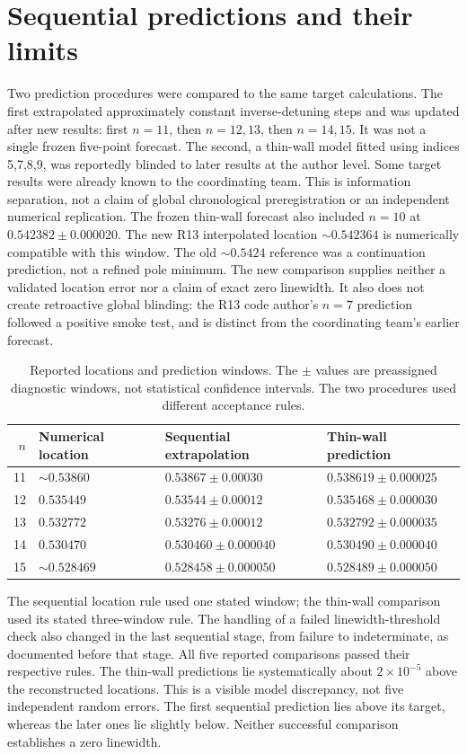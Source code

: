 \documentclass[a4paper,11pt]{article}
\begin{document}
\section{Sequential predictions and their limits}\label{sec:predictions}
Two prediction procedures were compared to the same target calculations.
The first extrapolated approximately constant inverse-detuning steps and
was updated after new results: first $n=11$, then $n=12,13$, then $n=14,15$.
It was not a single frozen five-point forecast. The second, a thin-wall
model fitted using indices 5,7,8,9, was reportedly blinded to later results
at the author level. Some target results were already known to the
coordinating team. This is information separation, not a claim of global
chronological preregistration or an independent numerical replication.
The frozen thin-wall forecast also included $n=10$ at
$0.542382\pm0.000020$. The new R13 interpolated location
$\sim0.542364$ is numerically compatible with this window. The old
$\sim0.5424$ reference was a continuation prediction, not a refined pole
minimum. The new comparison supplies neither a validated location error
nor a claim of exact zero linewidth. It also does not create retroactive
global blinding: the R13 code author's $n=7$ prediction followed a positive
smoke test, and is distinct from the coordinating team's earlier forecast.

\begin{table}[htbp]\centering\small
\caption{Reported locations and prediction windows. The $\pm$ values are
preassigned diagnostic windows, not statistical confidence intervals.
The two procedures used different acceptance rules.}\label{tab:forecast}
\begin{tabular}{rlll}\toprule
$n$&Numerical location&Sequential extrapolation&Thin-wall prediction\\\midrule
11&$\sim0.53860$&$0.53867\pm0.00030$&$0.538619\pm0.000025$\\
12&$0.535449$&$0.53544\pm0.00012$&$0.535468\pm0.000030$\\
13&$0.532772$&$0.53276\pm0.00012$&$0.532792\pm0.000035$\\
14&$0.530470$&$0.530460\pm0.000040$&$0.530490\pm0.000040$\\
15&$\sim0.528469$&$0.528458\pm0.000050$&$0.528489\pm0.000050$\\\bottomrule
\end{tabular}
\end{table}
The sequential location rule used one stated window; the thin-wall
comparison used its stated three-window rule. The handling of a failed
linewidth-threshold check also changed in the last sequential stage,
from failure to indeterminate, as documented before that stage.
All five reported comparisons passed their respective rules. The
thin-wall predictions lie systematically about $2\times10^{-5}$ above
the reconstructed locations. This is a visible model discrepancy, not
five independent random errors. The first sequential prediction lies
above its target, whereas the later ones lie slightly below.
Neither successful comparison establishes a zero linewidth.
\end{document}
